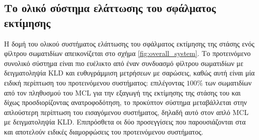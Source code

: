 \subsection{Το ολικό σύστημα ελάττωσης του σφάλματος εκτίμησης}

Η δομή του ολικού συστήματος ελάττωσης του σφάλματος εκτίμησης της στάσης ενός
φίλτρου σωματιδίων απεικονίζεται στο σχήμα \ref{fig:overall_system}.  Το
προτεινόμενο συνολικό σύστημα είναι πιο ευέλικτο από έναν συνδυασμό φίλτρου
σωματιδίων με δειγματοληψία KLD και ευθυγράμμιση μετρήσεων με σαρώσεις, καθώς
αυτή είναι μία ειδική περίπτωση του προτεινόμενου συστήματος: επιλέγοντας
$100\%$ των σωματιδίων από τον πληθυσμού του MCL για την εξαγωγή της εκτίμησης
της στάσης του και δίχως προσδιορίζοντας ανατροφοδότηση, το προκύπτον σύστημα
μεταβάλλεται στην απλούστερη περίπτωση του εισαγόμενου συστήματος, δηλαδή αυτό
στον απλό MCL με δειγματοληψία KLD. Επιπρόσθετα οι δύο προσεγγίσεις που
παρουσιάζονται στα \cite{Vasiljevic2016a} και \cite{Peng2018a} αποτελούν
ειδικές διαμορφώσεις του προτεινόμενου συστήματος.

